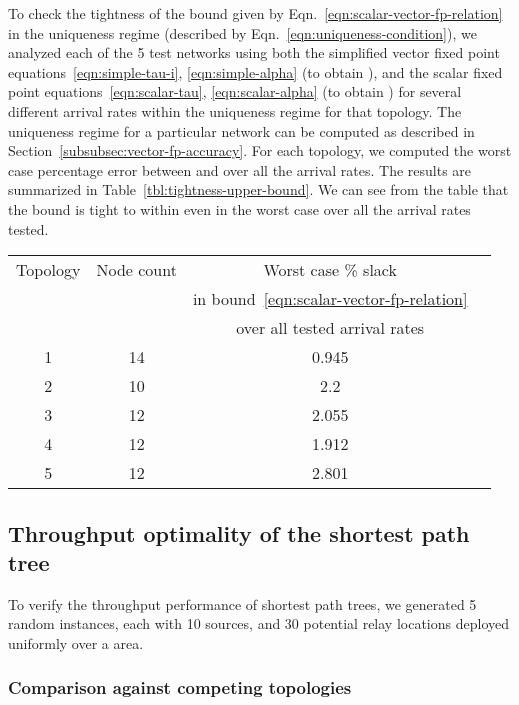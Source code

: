 \documentclass[12pt, draftclsnofoot, onecolumn]{IEEEtran}
\begin{document}
To check the tightness of the bound given by Eqn.~\eqref{eqn:scalar-vector-fp-relation} in the uniqueness regime (described by Eqn.~\ref{eqn:uniqueness-condition}), we analyzed each of the 5 test networks using both the simplified vector fixed point equations~\eqref{eqn:simple-tau-i}, \eqref{eqn:simple-alpha} (to obtain ), and the scalar fixed point equations~\eqref{eqn:scalar-tau}, \eqref{eqn:scalar-alpha} (to obtain ) for several different arrival rates within the uniqueness regime for that topology. The uniqueness regime for a particular network can be computed as described in Section~\ref{subsubsec:vector-fp-accuracy}. For each topology, we computed the worst case percentage error between  and  over all the arrival rates. The results are summarized in Table~\ref{tbl:tightness-upper-bound}. We can see from the table that the bound is tight to within  even in the worst case over all the arrival rates tested. 

\begin{table*}[ht]
  \centering
\caption{Slackness in the bound \eqref{eqn:scalar-vector-fp-relation}}
\label{tbl:tightness-upper-bound}
\footnotesize
  \begin{tabular}{|c|c|c|c|}\hline
    Topology & Node count & Worst case \% slack\\
             &            & in bound~\eqref{eqn:scalar-vector-fp-relation}\\
             &            & over all tested arrival rates\\
   \hline
   1 & 14 & 0.945\\
   \hline
   2 & 10 & 2.2\\	
  \hline
   3 & 12 & 2.055\\
  \hline
   4 & 12 & 1.912\\
  \hline
   5 & 12 & 2.801\\   
  \hline
\end{tabular}
\normalsize
\end{table*}
 
\subsection{Throughput optimality of the shortest path tree}
\label{subsec:spt-throughput}
To verify the throughput performance of shortest path trees, we generated 5 random instances, each with 10 sources, and 30 potential relay locations deployed uniformly over a  area.

\subsubsection{Comparison against competing topologies}
\label{subsubsec:competing-topologies-compare}
\end{document}
